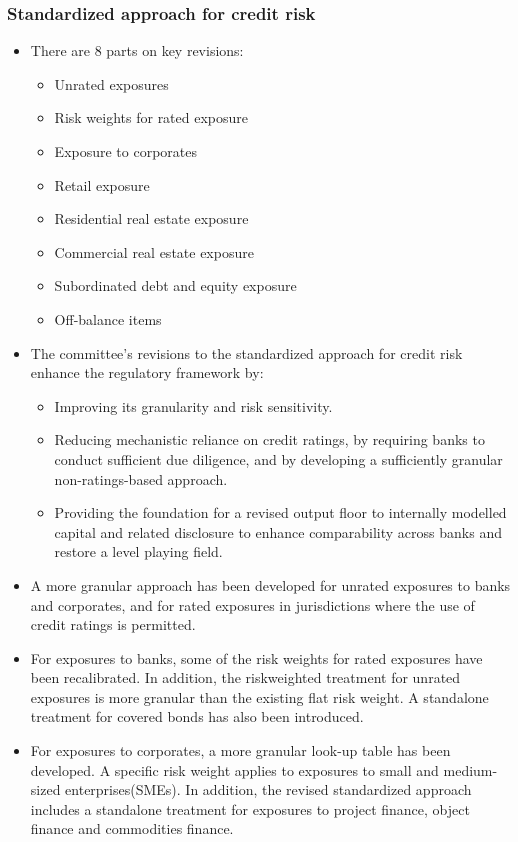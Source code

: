 \subsubsection{Standardized approach for credit risk}
\begin{itemize}
\item There are 8 parts on key revisions:
    \begin{itemize}
    \item Unrated exposures
    \item Risk weights for rated exposure
    \item Exposure to corporates
    \item Retail exposure
    \item Residential real estate exposure
    \item Commercial real estate exposure
    \item Subordinated debt and equity exposure
    \item Off-balance items
    \end{itemize}
\item The committee's revisions to the standardized approach for credit risk enhance the regulatory framework by:
    \begin{itemize}
    \item Improving its granularity and risk sensitivity.
    \item Reducing mechanistic reliance on credit ratings, by requiring banks to conduct sufficient due diligence, and by developing a sufficiently granular non-ratings-based approach.
    \item Providing the foundation for a revised output floor to internally modelled capital and related disclosure to enhance comparability across banks and restore a level playing field.
    \end{itemize}
\item A more granular approach has been developed for unrated exposures to banks and corporates, and for rated exposures in jurisdictions where the use of credit ratings is permitted.
\item For exposures to banks, some of the risk weights for rated exposures have been recalibrated. In addition, the riskweighted treatment for unrated exposures is more granular than the existing flat risk weight. A standalone treatment for covered bonds has also been introduced.
\item For exposures to corporates, a more granular look-up table has been developed. A specific risk weight applies to exposures to small and medium-sized enterprises(SMEs). In addition, the revised standardized approach includes a standalone treatment for exposures to project finance, object finance and commodities finance.

\end{itemize}
